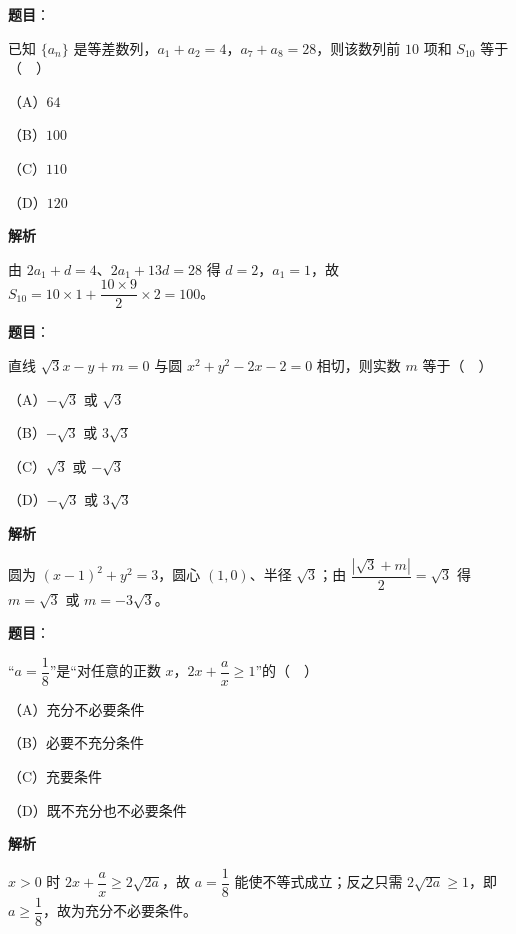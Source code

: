 \begin{answer}

\textbf{题目}：

已知 $\{a_n\}$ 是等差数列，$a_1+a_2=4$，$a_7+a_8=28$，则该数列前 $10$ 项和 $S_{10}$ 等于（　）

（A）$64$

（B）$100$

（C）$110$

（D）$120$

\textbf{解析}

由 $2a_1+d=4$、$2a_1+13d=28$ 得 $d=2$，$a_1=1$，故 $S_{10}=10\times1+\dfrac{10\times9}2\times2=100$。


\end{answer}
\begin{answer}

\textbf{题目}：

直线 $\sqrt3x-y+m=0$ 与圆 $x^2+y^2-2x-2=0$ 相切，则实数 $m$ 等于（　）

（A）$-\sqrt3$ 或 $\sqrt3$

（B）$-\sqrt3$ 或 $3\sqrt3$

（C）$\sqrt3$ 或 $-\sqrt3$

（D）$-\sqrt3$ 或 $3\sqrt3$

\textbf{解析}

圆为 $(x-1)^2+y^2=3$，圆心 $(1,0)$、半径 $\sqrt3$；由 $\dfrac{|\sqrt3+m|}2=\sqrt3$ 得 $m=\sqrt3$ 或 $m=-3\sqrt3$。


\end{answer}
\begin{answer}

\textbf{题目}：

“$a=\dfrac18$”是“对任意的正数 $x$，$2x+\dfrac ax\geqslant1$”的（　）

（A）充分不必要条件

（B）必要不充分条件

（C）充要条件

（D）既不充分也不必要条件

\textbf{解析}

$x>0$ 时 $2x+\dfrac ax\geqslant2\sqrt{2a}$，故 $a=\dfrac18$ 能使不等式成立；反之只需 $2\sqrt{2a}\geqslant1$，即 $a\geqslant\dfrac18$，故为充分不必要条件。


\end{answer}
